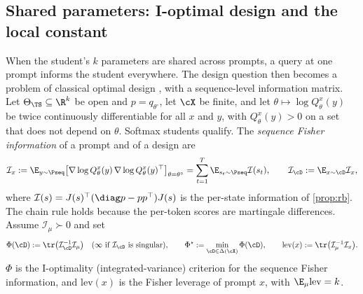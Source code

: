 \subsection{Shared parameters: I-optimal design and the local constant}\label{sec:local-design}

When the student's $k$ parameters are shared across prompts, a query at one prompt informs the student
everywhere. The design question then becomes a problem of classical optimal design
\citep{kiefer1960equivalence,pukelsheim1993optimal}, with a sequence-level information matrix. Let
$\Theta_\TS\subseteq\R^k$ be open and $p=q_{\theta^\circ}$, let $\cX$ be finite, and let $\theta\mapsto\log Q^x_\theta(y)$ be
twice continuously differentiable for all $x$ and $y$, with $Q^x_\theta(y)>0$ on a set that does not depend on
$\theta$. Softmax students qualify. The \emph{sequence Fisher information} of a prompt and of a design are
\[
\mathcal I_x:=\E_{y\sim\Pseq}\big[\nabla\log Q^x_\theta(y)\,\nabla\log Q^x_\theta(y)^\top\big]_{\theta=\theta^\circ}
=\sum_{t=1}^T\E_{s_t\sim\Pseq}\mathcal I(s_t),\qquad\mathcal I_\cD:=\E_{x\sim\cD}\mathcal I_x ,
\]
where $\mathcal I(s)=J(s)^\top(\diag p-pp^\top)J(s)$ is the per-state information of \cref{prop:rb}. The chain
rule holds because the per-token scores are martingale differences. Assume $\mathcal I_\mu\succ0$ and set
\[
\Phi(\cD):=\tr\big(\mathcal I_\cD^{-1}\mathcal I_\mu\big)\quad(\infty\text{ if }\mathcal I_\cD\text{ is singular}),\qquad
\Phi^\star:=\min_{\cD\in\Delta(\cX)}\Phi(\cD),\qquad\mathrm{lev}(x):=\tr\big(\mathcal I_\mu^{-1}\mathcal I_x\big).
\]
$\Phi$ is the I-optimality (integrated-variance) criterion for the sequence Fisher information, and
$\mathrm{lev}(x)$ is the Fisher leverage of prompt $x$, with $\E_\mu\mathrm{lev}=k$.

